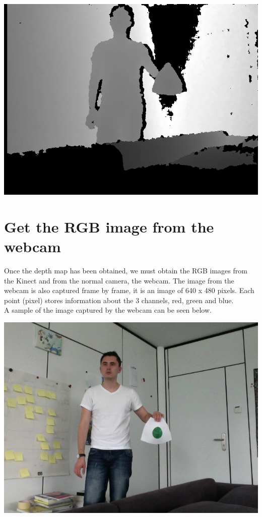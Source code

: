 \begin{center}
	\includegraphics[scale=0.6]{images/original_depth.jpg}
	\label{fig:depth_image}
\end{center}

\section{Get the RGB image from the webcam}
\noindent
Once the depth map has been obtained, we must obtain the RGB images from the Kinect and from the normal camera, the webcam. The image from the webcam is also captured frame by frame, it is an image of 640 x 480 pixels. Each point (pixel) stores information about the 3 channels, red, green and blue. 
\\
A sample of the image captured by the webcam can be seen below.

\begin{center}
	\includegraphics[scale=0.4]{images/rgb_image.jpg}
	\label{fig:rgb_image}
\end{center}


